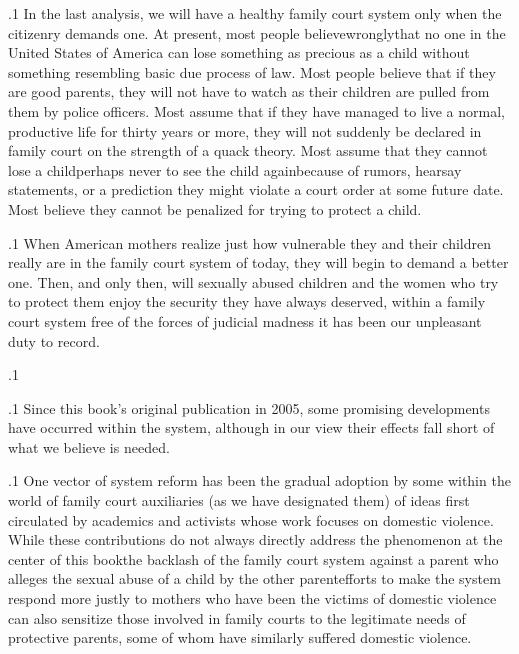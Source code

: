\documentclass[11pt, twoside]{article}
\begin{document}
{\p.1{%
In the last analysis, we will have a healthy family court system only
when the citizenry demands one. At present, most people
believe\mdash{}wrongly\mdash{}that no one in the United States of America can lose something as precious as a child without something resembling basic due
process of law. Most people believe that if they are good parents, they
will not have to watch as their children are pulled from them by police officers. Most assume that if they have managed to live a normal,
productive life for thirty years or more, they will not suddenly be declared  in family court on the strength of a quack theory. Most
assume that they cannot lose a child\mdash{}perhaps never to see the child
again\mdash{}because of rumors, hearsay statements, or a prediction they
might violate a court order at some future date. Most believe they cannot
be penalized for trying to protect a child.
}%

\p.1{%
When American mothers realize just how vulnerable they and their
children really are in the family court system of today, they will begin to
demand a better one. Then, and only then, will sexually abused children
and the women who try to protect them enjoy the security they have always deserved, within a family court system free of the forces of judicial
madness it has been our unpleasant duty to record.
}%

\p.1{%
\writeAddendum{}
}%

\p.1{%
\noindent{}Since this book’s original publication in 2005, some promising developments have occurred within the system, although in our view their
effects fall short of what we believe is needed.
}%

\p.1{%
One vector of system reform has been the gradual adoption by some
within the world of family court auxiliaries (as we have designated them)
of ideas first circulated by academics and activists whose work focuses
on domestic violence. While these contributions do not always directly
address the phenomenon at the center of this book\mdash{}the backlash of
the family court system against a parent who alleges the sexual abuse of
a child by the other parent\mdash{}efforts to make the system respond more
justly to mothers who have been the victims of domestic violence can
also sensitize those involved in family courts to the legitimate needs
of protective parents, some of whom have similarly suffered domestic
violence.
}%

}
\end{document}
